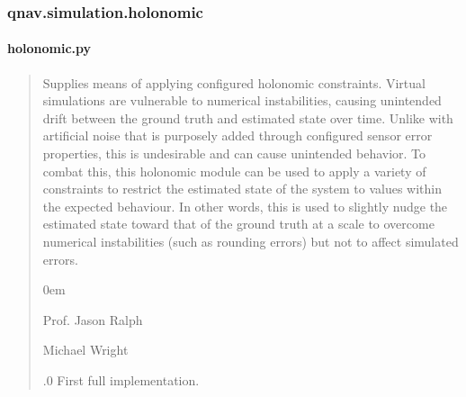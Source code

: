 \documentclass[letterpaper,10pt,english]{sphinxmanual}
\begin{document}
\sphinxstepscope


\subsubsection{qnav.simulation.holonomic}
\label{\detokenize{modules/simulation/holonomic:module-qnav.simulation.holonomic}}\label{\detokenize{modules/simulation/holonomic:qnav-simulation-holonomic}}\label{\detokenize{modules/simulation/holonomic::doc}}

\paragraph{holonomic.py}
\label{\detokenize{modules/simulation/holonomic:holonomic-py}}\begin{quote}\begin{description}
\sphinxAtStartPar
Supplies means of applying configured holonomic constraints.
Virtual simulations are vulnerable to numerical instabilities, causing
unintended drift between the ground truth and estimated state over time.
Unlike with artificial noise that is purposely added through configured
sensor error properties, this is undesirable and can cause unintended
behavior. To combat this, this holonomic module can be used to apply
a variety of constraints to restrict the estimated state of the system
to values within the expected behaviour. In other words, this is used
to slightly nudge the estimated state toward that of the ground truth
at a scale to overcome numerical instabilities (such as rounding errors)
but not to affect simulated errors.

\begin{DUlineblock}{0em}
\item[] Prof. Jason Ralph \sphinxhyphen{} 
\item[] Michael Wright \sphinxhyphen{} 
\end{DUlineblock}

.0 \sphinxhyphen{} First full implementation.

\end{description}\end{quote}
\end{document}
